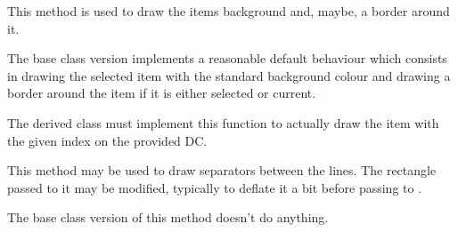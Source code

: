 \label{wxvlistboxondrawbackground}


This method is used to draw the items background and, maybe, a border
around it.

The base class version implements a reasonable default behaviour which
consists in drawing the selected item with the standard background
colour and drawing a border around the item if it is either selected or
current.


\label{wxvlistboxondrawitem}


The derived class must implement this function to actually draw the item
with the given index on the provided DC.






\label{wxvlistboxondrawseparator}


This method may be used to draw separators between the lines. The rectangle
passed to it may be modified, typically to deflate it a bit before passing to
.

The base class version of this method doesn't do anything.






\label{wxvlistboxonmeasureitem}



